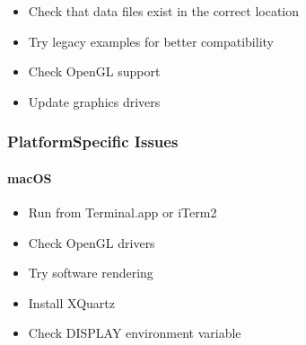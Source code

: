 \documentclass[a4paper,10pt,english,openany,oneside]{sphinxmanual}
\begin{document}
\begin{description}
\begin{itemize}
\item {} 
\sphinxAtStartPar
Check that data files exist in the correct location

\end{itemize}

\begin{itemize}
\item {} 
\sphinxAtStartPar
Try legacy examples for better compatibility

\item {} 
\sphinxAtStartPar
Check OpenGL support

\item {} 
\sphinxAtStartPar
Update graphics drivers

\end{itemize}

\end{description}


\subsubsection{Platform\sphinxhyphen{}Specific Issues}
\label{\detokenize{examples:platform-specific-issues}}

\paragraph{macOS}
\label{\detokenize{examples:macos}}\begin{description}
\begin{itemize}
\item {} 
\sphinxAtStartPar
Run from Terminal.app or iTerm2

\item {} 
\sphinxAtStartPar
Check OpenGL drivers

\item {} 
\sphinxAtStartPar
Try software rendering

\end{itemize}

\begin{itemize}
\item {} 
\sphinxAtStartPar
Install XQuartz

\item {} 
\sphinxAtStartPar
Check DISPLAY environment variable

\end{itemize}

\end{description}
\end{document}
